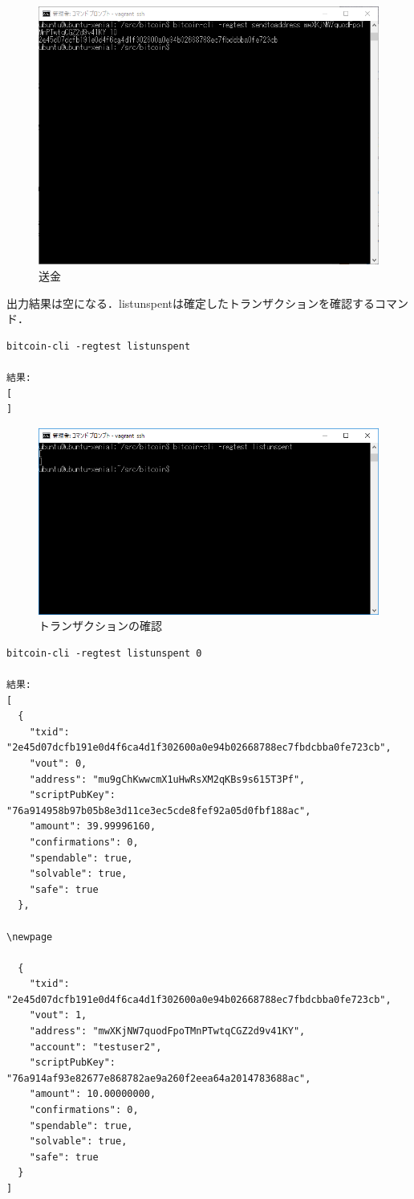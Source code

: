 \begin{figure}[h]
\centering
\includegraphics[width=12cm]{sendmoney.PNG}
\caption{送金}\label{サンプル図}
\end{figure}

出力結果は空になる．listunspentは確定したトランザクションを確認するコマンド．
\begin{verbatim}
bitcoin-cli -regtest listunspent

結果:
[
]
\end{verbatim}

\begin{figure}[h]
\centering
\includegraphics[width=12cm]{tran.PNG}
\caption{トランザクションの確認}\label{サンプル図}
\end{figure}

\newpage


\begin{verbatim}
bitcoin-cli -regtest listunspent 0

結果:
[
  {
    "txid": "2e45d07dcfb191e0d4f6ca4d1f302600a0e94b02668788ec7fbdcbba0fe723cb",
    "vout": 0,
    "address": "mu9gChKwwcmX1uHwRsXM2qKBs9s615T3Pf",
    "scriptPubKey": "76a914958b97b05b8e3d11ce3ec5cde8fef92a05d0fbf188ac",
    "amount": 39.99996160,
    "confirmations": 0,
    "spendable": true,
    "solvable": true,
    "safe": true
  },

\newpage

  {
    "txid": "2e45d07dcfb191e0d4f6ca4d1f302600a0e94b02668788ec7fbdcbba0fe723cb",
    "vout": 1,
    "address": "mwXKjNW7quodFpoTMnPTwtqCGZ2d9v41KY",
    "account": "testuser2",
    "scriptPubKey": "76a914af93e82677e868782ae9a260f2eea64a2014783688ac",
    "amount": 10.00000000,
    "confirmations": 0,
    "spendable": true,
    "solvable": true,
    "safe": true
  }
]
\end{verbatim}

